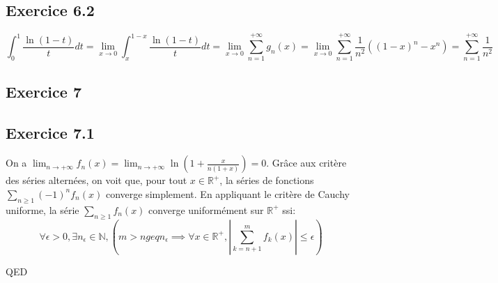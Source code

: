 \documentclass[]{book}
\theoremstyle{definition}
\newcommand{\bb}[1]{\mathbb{#1}}
\newcommand{\R}{\bb{R}}
\newcommand{\N}{\bb{N}}
\begin{document}
\subsection*{Exercice 6.2}
$$\int_{0}^{1}{\frac{\ln(1-t)}{t}dt} = \lim_{x \to 0}\int_{x}^{1-x}{\frac{\ln(1-t)}{t}dt} = \lim_{x \to 0}\sum_{n=1}^{+\infty}{g_n(x)} = \lim_{x \to 0}\sum_{n=1}^{+\infty}{\frac{1}{n^2} ((1-x)^n-x^n)} = \sum_{n=1}^{+\infty}{\frac{1}{n^2}}$$

\subsection*{Exercice 7}
\subsection*{Exercice 7.1}
On a $\lim_{n \to +\infty}f_n(x) = \lim_{n \to +\infty}\ln(1+\frac{x}{n(1+x)}) = 0$. Gr\^ace aux crit\`ere des s\'eries altern\'ees, on voit que, pour tout $x \in \R^{+}$, la s\'eries de fonctions $\sum_{n \geq 1} {(-1)^nf_n(x)}$ converge simplement. En appliquant le crit\`ere de Cauchy uniforme, la s\'erie $\sum_{n\geq 1} f_n(x)$ converge uniform\'ement sur $\R^{+}$ ssi:
$$\forall \epsilon > 0, \exists n_{\epsilon} \in \N, (m > n geq n_{\epsilon} \implies \forall x \in \R^{+}, |\sum_{k=n+1}^{m} f_k(x)|  \leq \epsilon)$$ 

  





QED
\end{document}
